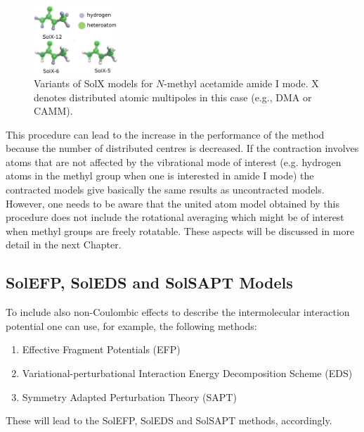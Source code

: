 \documentclass[a4paper,titlepage,twoside,fleqn,12pt]{book}
\begin{document}
\begin{refsection}
\begin{figure}[b!]
\begin{center}
    \includegraphics[width=0.28\textwidth]{SolXn.eps}
  \end{center}
  \caption{Variants of SolX models for $N$-methyl acetamide amide I mode.
X denotes distributed atomic multipoles in this case (e.g., DMA or CAMM).\label{f:solxn}}
\end{figure}
%
\noindent This procedure can lead to the increase in the performance
of the method because the number of distributed centres
is decreased. If the contraction involves atoms that 
are not affected by the vibrational mode of interest (e.g. 
hydrogen atoms in the methyl group when one is interested
in amide I mode) the contracted models give basically 
the same results as uncontracted models. However, one needs to 
be aware that the united atom model obtained by this procedure
does not include the rotational averaging which might be of
interest when methyl groups are freely rotatable. These aspects 
will be discussed in more detail in the next Chapter. 

\subsection{SolEFP, SolEDS and SolSAPT Models\label{s:solefp-soleds-solsapt}}

To include also non\hyp{}Coulombic effects to describe 
the intermolecular interaction potential one can use, for example,
the following methods:
%
\begin{enumerate}
  \item Effective Fragment 
Potentials \citep{Day.Jensen.Gordon.Webb.Stevens.Krauss.Garmer.Basch.Cohen.JCP.1996,
Flick.Kosenkov.Hohenstein.Sherrill.Slipchenko.JCTC.2012} (EFP)
  \item Variational\hyp{}perturbational Interaction Energy Decomposition
Scheme \citep{Sokalski.Roszak.Pecul.CPL.1988,
Chalasinski.Szczesniak.MolPhys.1988,Cybulski.Chalasinski.Moszynski.JCP.1990,
Gora.Bartkowiak.Roszak.Leszczynski.JCP.2004} (EDS)
  \item Symmetry Adapted Perturbation Theory \citep{Jeziorski.Moszynski.Szalewicz.ChemRev.1994} (SAPT)
\end{enumerate}
%
These will lead to the SolEFP, SolEDS and SolSAPT methods, accordingly. 


\end{refsection}
\end{document}
